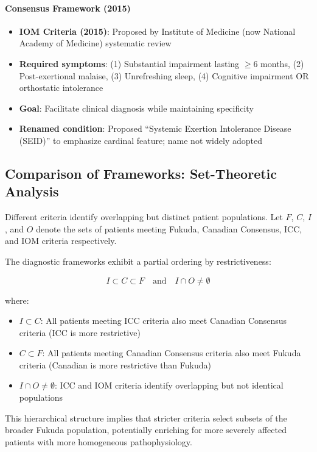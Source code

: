 \paragraph{Consensus Framework (2015)}
\begin{itemize}
    \item \textbf{IOM Criteria (2015)}: Proposed by Institute of Medicine (now National Academy of Medicine) systematic review
    \item \textbf{Required symptoms}: (1) Substantial impairment lasting $\geq$6 months, (2) Post-exertional malaise, (3) Unrefreshing sleep, (4) Cognitive impairment OR orthostatic intolerance
    \item \textbf{Goal}: Facilitate clinical diagnosis while maintaining specificity
    \item \textbf{Renamed condition}: Proposed ``Systemic Exertion Intolerance Disease (SEID)'' to emphasize cardinal feature; name not widely adopted
\end{itemize}

\subsection{Comparison of Frameworks: Set-Theoretic Analysis}

Different criteria identify overlapping but distinct patient populations. Let $F$, $C$, $I$, and $O$ denote the sets of patients meeting Fukuda, Canadian Consensus, ICC, and IOM criteria respectively.

\begin{observation}
\label{obs:criteria-hierarchy}
The diagnostic frameworks exhibit a partial ordering by restrictiveness:

\begin{equation}
I \subset C \subset F \quad \text{and} \quad I \cap O \neq \emptyset
\end{equation}

where:
\begin{itemize}
    \item $I \subset C$: All patients meeting ICC criteria also meet Canadian Consensus criteria (ICC is more restrictive)
    \item $C \subset F$: All patients meeting Canadian Consensus criteria also meet Fukuda criteria (Canadian is more restrictive than Fukuda)
    \item $I \cap O \neq \emptyset$: ICC and IOM criteria identify overlapping but not identical populations
\end{itemize}

This hierarchical structure implies that stricter criteria select subsets of the broader Fukuda population, potentially enriching for more severely affected patients with more homogeneous pathophysiology.
\end{observation}

